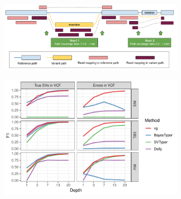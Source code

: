 \documentclass{article}
\begin{document}
\begin{figure}
  \begin{subfigure}[b]{\textwidth}
    \caption{}
    \includegraphics[width=\textwidth]{vg-call-cartoon.pdf}
  \end{subfigure}

  \begin{subfigure}[b]{\textwidth}
    \caption{}
    \includegraphics[width=\textwidth]{pdf/simerror-geno.pdf}
  \end{subfigure}
\end{figure}
\end{document}
